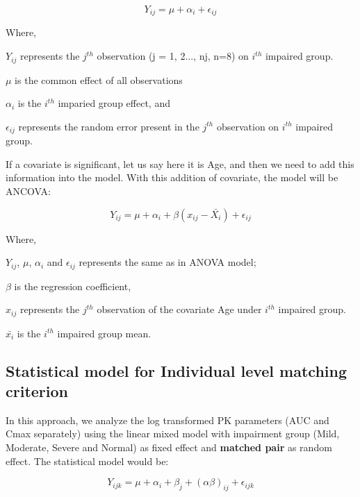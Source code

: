 \documentclass[final]{statistica}
\begin{document}
\begin{equation}\label{eq1}
Y_{ij} = {\mu + \alpha_i + \epsilon_{ij}}
\end{equation}

Where,
\par
$Y_{ij}$ represents the $j^{th}$ observation (j = 1, 2..., nj, n=8) on $i^{th}$ impaired group.
\par
$\mu$ is the common effect of all observations
\par
$\alpha_i$ is the $i^{th}$ imparied group effect, and 
\par
$\epsilon_{ij}$ represents the random error present in the $j^{th}$ observation on $i^{th}$ impaired group.
\vspace{3mm}
\par
If a covariate is significant, let us say here it is Age, and then we need to add this information into the model. With this addition of covariate, the model will be ANCOVA: 

\begin{equation}\label{eq2}
Y_{ij} = {\mu + \alpha_i + \beta (x_{ij} - \bar{X_i})+ \epsilon_{ij}}
\end{equation}

Where,
\par
$Y_{ij}$, $\mu$, $\alpha_i$ and $\epsilon_{ij}$ represents the same as in ANOVA model;
\par
$\beta$ is the regression coefficient, 
\par
$x_{ij}$ represents the $j^{th}$ observation of the covariate Age under $i^{th}$ impaired group.
\par
$\bar{x_i}$ is the $i^{th}$ impaired group mean.

\subsection{Statistical model for Individual level matching criterion}

In this approach, we analyze the log transformed PK parameters (AUC and Cmax separately) using the linear mixed model with impairment group (Mild, Moderate, Severe and Normal) as fixed effect and \textbf{matched pair} as random effect. The statistical model would be:

\begin{equation}\label{eq3}
Y_{ijk} = {\mu + \alpha_i + \beta_j + (\alpha\beta)_{ij} + \epsilon_{ijk}}
\end{equation}
\end{document}
